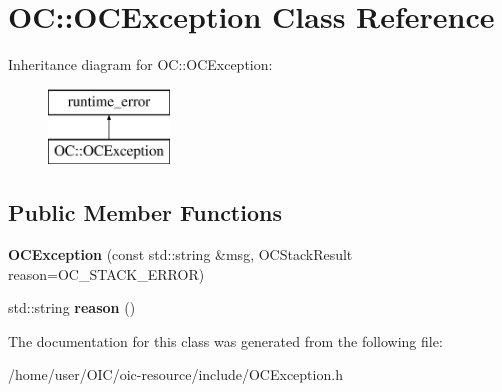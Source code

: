 \hypertarget{classOC_1_1OCException}{}\section{O\+C\+:\+:O\+C\+Exception Class Reference}
\label{classOC_1_1OCException}
Inheritance diagram for O\+C\+:\+:O\+C\+Exception\+:\begin{figure}[H]
\begin{center}
\leavevmode
\includegraphics[height=2.000000cm]{classOC_1_1OCException}
\end{center}
\end{figure}
\subsection*{Public Member Functions}
\begin{DoxyCompactItemize}
\item 
\hypertarget{classOC_1_1OCException_a88300c0e6db05f0392431cd04a0d1eba}{}{\bfseries O\+C\+Exception} (const std\+::string \&msg, O\+C\+Stack\+Result reason=O\+C\+\_\+\+S\+T\+A\+C\+K\+\_\+\+E\+R\+R\+O\+R)\label{classOC_1_1OCException_a88300c0e6db05f0392431cd04a0d1eba}

\item 
\hypertarget{classOC_1_1OCException_a41a455855fd902af894914ded12c7c03}{}std\+::string {\bfseries reason} ()\label{classOC_1_1OCException_a41a455855fd902af894914ded12c7c03}

\end{DoxyCompactItemize}


The documentation for this class was generated from the following file\+:\begin{DoxyCompactItemize}
\item 
/home/user/\+O\+I\+C/oic-\/resource/include/O\+C\+Exception.\+h\end{DoxyCompactItemize}
